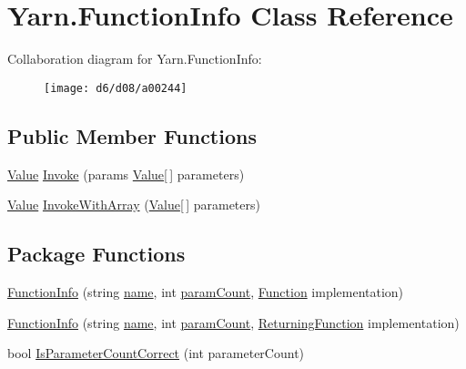 \hypertarget{a00041}{\section{Yarn.\-Function\-Info Class Reference}
\label{a00041}
}


Collaboration diagram for Yarn.\-Function\-Info\-:
\nopagebreak
\begin{figure}[H]
\begin{center}
\leavevmode
\texttt{[image: d6/d08/a00244]}
\end{center}
\end{figure}
\subsection*{Public Member Functions}
\begin{DoxyCompactItemize}
\item 
\hyperlink{a00086}{Value} \hyperlink{a00041_ab400ac66785d7df2e3fc0f3ce3796044}{Invoke} (params \hyperlink{a00086}{Value}\mbox{[}$\,$\mbox{]} parameters)
\item 
\hyperlink{a00086}{Value} \hyperlink{a00041_a3ce11058d35232907a738de4bb094c67}{Invoke\-With\-Array} (\hyperlink{a00086}{Value}\mbox{[}$\,$\mbox{]} parameters)
\end{DoxyCompactItemize}
\subsection*{Package Functions}
\begin{DoxyCompactItemize}
\item 
\hyperlink{a00041_a93457cd0e838cb2ef59cc2a3a46ce758}{Function\-Info} (string \hyperlink{a00041_adb38e83e3c1597b553aeff14bef5bfcb}{name}, int \hyperlink{a00041_aa8527de9e4f153b05164ccaf167c3186}{param\-Count}, \hyperlink{a00026_ae0be2e5cf13d5779816102439e61ff1a}{Function} implementation)
\item 
\hyperlink{a00041_a41d97c09da25caede70cb734d18113b9}{Function\-Info} (string \hyperlink{a00041_adb38e83e3c1597b553aeff14bef5bfcb}{name}, int \hyperlink{a00041_aa8527de9e4f153b05164ccaf167c3186}{param\-Count}, \hyperlink{a00026_a5177bf74fbfe7303fac9d8236c2e514b}{Returning\-Function} implementation)
\item 
bool \hyperlink{a00041_a1ed09ff8aafa230a0d2bbc23cd6cd763}{Is\-Parameter\-Count\-Correct} (int parameter\-Count)
\end{DoxyCompactItemize}
